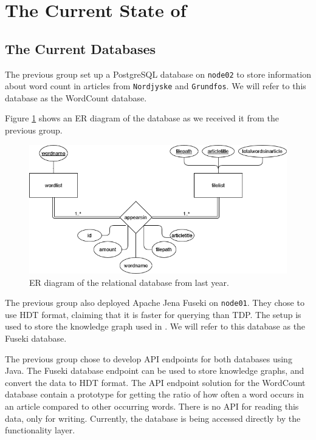 \section{The Current State of \knox{}} \label{currentState}





\subsection{The Current \knox{} Databases}
The previous group set up a PostgreSQL database on \texttt{node02} to store information about word count in articles from \texttt{Nordjyske} and \texttt{Grundfos}. We will refer to this database as the WordCount database.

Figure \ref{olddatabase} shows an ER diagram of the database as we received it from the previous group.

\begin{figure}[h]
    \centering
    \includegraphics[width=\linewidth]{Images/old_db_er_diagram.png}
    \caption{ER diagram of the relational database from last year.}
    \label{olddatabase}
\end{figure}


The previous group also deployed Apache Jena Fuseki on \texttt{node01}. They chose to use HDT format, claiming that it is faster for querying than TDP\cite{knox2020}. 
The setup is used to store the knowledge graph used in \knox{}.
We will refer to this database as the Fuseki database. 

The previous group chose to develop API endpoints for both databases using Java.
The Fuseki database endpoint can be used to store knowledge graphs, and convert the data to HDT format. The API endpoint solution for the WordCount database contain a prototype for getting the ratio of how often a word occurs in an article compared to other occurring words.
There is no API for reading this data, only for writing. Currently, the database is being accessed directly by the functionality layer. 


